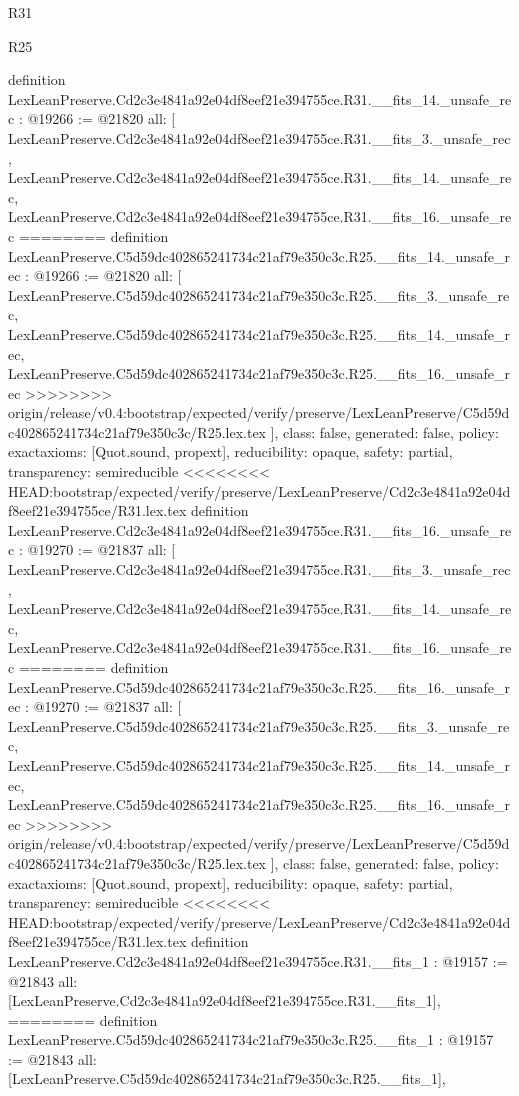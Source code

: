 \begin{lexlean}{R31}
\begin{lexlean}{R25}
\begin{coremodule}
{{{{{{{{{{{{{{{{{{{{{{{{{{{{{{{{{{{{{{{{{{{{{{{{{{{{{{{{{{{{{{{{{{{{{{{{{{{{{{{{{{{{{{{{{definition LexLeanPreserve.Cd2c3e4841a92e04df8eef21e394755ce.R31.__fits_14._unsafe_rec : @19266 := @21820 {
  all: [
    LexLeanPreserve.Cd2c3e4841a92e04df8eef21e394755ce.R31.__fits_3._unsafe_rec,
    LexLeanPreserve.Cd2c3e4841a92e04df8eef21e394755ce.R31.__fits_14._unsafe_rec,
    LexLeanPreserve.Cd2c3e4841a92e04df8eef21e394755ce.R31.__fits_16._unsafe_rec
========
definition LexLeanPreserve.C5d59dc402865241734c21af79e350c3c.R25.__fits_14._unsafe_rec : @19266 := @21820 {
  all: [
    LexLeanPreserve.C5d59dc402865241734c21af79e350c3c.R25.__fits_3._unsafe_rec,
    LexLeanPreserve.C5d59dc402865241734c21af79e350c3c.R25.__fits_14._unsafe_rec,
    LexLeanPreserve.C5d59dc402865241734c21af79e350c3c.R25.__fits_16._unsafe_rec
>>>>>>>> origin/release/v0.4:bootstrap/expected/verify/preserve/LexLeanPreserve/C5d59dc402865241734c21af79e350c3c/R25.lex.tex
  ],
  class: false,
  generated: false,
  policy: exact{axioms: [Quot.sound, propext]},
  reducibility: opaque{},
  safety: partial,
  transparency: semireducible
}
<<<<<<<< HEAD:bootstrap/expected/verify/preserve/LexLeanPreserve/Cd2c3e4841a92e04df8eef21e394755ce/R31.lex.tex
definition LexLeanPreserve.Cd2c3e4841a92e04df8eef21e394755ce.R31.__fits_16._unsafe_rec : @19270 := @21837 {
  all: [
    LexLeanPreserve.Cd2c3e4841a92e04df8eef21e394755ce.R31.__fits_3._unsafe_rec,
    LexLeanPreserve.Cd2c3e4841a92e04df8eef21e394755ce.R31.__fits_14._unsafe_rec,
    LexLeanPreserve.Cd2c3e4841a92e04df8eef21e394755ce.R31.__fits_16._unsafe_rec
========
definition LexLeanPreserve.C5d59dc402865241734c21af79e350c3c.R25.__fits_16._unsafe_rec : @19270 := @21837 {
  all: [
    LexLeanPreserve.C5d59dc402865241734c21af79e350c3c.R25.__fits_3._unsafe_rec,
    LexLeanPreserve.C5d59dc402865241734c21af79e350c3c.R25.__fits_14._unsafe_rec,
    LexLeanPreserve.C5d59dc402865241734c21af79e350c3c.R25.__fits_16._unsafe_rec
>>>>>>>> origin/release/v0.4:bootstrap/expected/verify/preserve/LexLeanPreserve/C5d59dc402865241734c21af79e350c3c/R25.lex.tex
  ],
  class: false,
  generated: false,
  policy: exact{axioms: [Quot.sound, propext]},
  reducibility: opaque{},
  safety: partial,
  transparency: semireducible
}
<<<<<<<< HEAD:bootstrap/expected/verify/preserve/LexLeanPreserve/Cd2c3e4841a92e04df8eef21e394755ce/R31.lex.tex
definition LexLeanPreserve.Cd2c3e4841a92e04df8eef21e394755ce.R31.__fits_1 : @19157 := @21843 {
  all: [LexLeanPreserve.Cd2c3e4841a92e04df8eef21e394755ce.R31.__fits_1],
========
definition LexLeanPreserve.C5d59dc402865241734c21af79e350c3c.R25.__fits_1 : @19157 := @21843 {
  all: [LexLeanPreserve.C5d59dc402865241734c21af79e350c3c.R25.__fits_1],
}}}}}}}}}}}}}}}}}}}}}}}}}}}}}}}}}}}}}}}}}}}}}}}}}}}}}}}}}}}}}}}}}}}}}}}}}}}}}}}}}}}}}}}}}}}}}
\end{coremodule}
\end{lexlean}
\end{lexlean}
